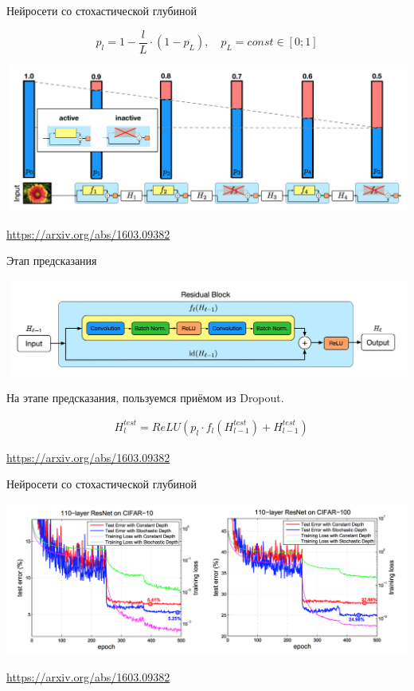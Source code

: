 \documentclass[notes,12pt, aspectratio=169]{beamer}
\begin{document}
\begin{frame}{Нейросети со стохастической глубиной}

\[
p_l = 1 - \frac{l}{L} \cdot (1 - p_L), \quad p_L = const \in [0;1]
\]

\begin{center}
	\includegraphics[width=0.9\paperwidth]{save_resnet.png}
\end{center}

\vfill %
\footnotesize 
\color{blue} \url{https://arxiv.org/abs/1603.09382}
\end{frame}


\begin{frame}{Этап предсказания}
\begin{center}
	\includegraphics[width=0.9\paperwidth]{resnet_stoc.png}
\end{center}

На этапе предсказания, пользуемся приёмом из Dropout. 

\begin{equation*}
\begin{aligned}
& H_l^{test} = ReLU(p_l \cdot f_l(H^{test}_{l-1}) + H^{test}_{l-1} ) 
\end{aligned} 
\end{equation*}

\vfill %
\footnotesize 
\color{blue} \url{https://arxiv.org/abs/1603.09382}
\end{frame}


\begin{frame}{Нейросети со стохастической глубиной}
\begin{center}
	\includegraphics[width=0.9\paperwidth]{st_resnet_train.png}
\end{center}

\vfill %
\footnotesize 
\color{blue} \url{https://arxiv.org/abs/1603.09382}
\end{frame}
\end{document}

